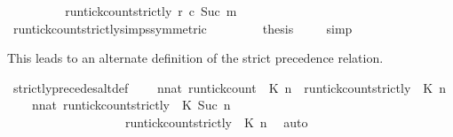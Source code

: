 \begin{isabellebody}
\isanewline
\ \ \ \ \isamarkupfalse%
\ \isamarkupfalse%
\ {\isacartoucheopen}{\isachardot}{\isachardot}{\isachardot}\ {\isacharequal}\ run{\isacharunderscore}tick{\isacharunderscore}count{\isacharunderscore}strictly\ r\ c\ {\isacharparenleft}Suc\ m{\isacharparenright}{\isacartoucheclose}\isanewline
\ \ \ \ \ \ \isamarkupfalse%
\ run{\isacharunderscore}tick{\isacharunderscore}count{\isacharunderscore}strictly{\isachardot}simps{\isacharparenleft}{}{\isacharparenright}{\isacharbrackleft}symmetric{\isacharbrackright}\ \isacommand{{\isachardot}}\isamarkupfalse%
\isanewline
\ \ \ \ \isamarkupfalse%
\ \isamarkupfalse%
\ {\isacharquery}thesis\ \isamarkupfalse%
\ {\isacharasterisk}\ \isamarkupfalse%
\ simp\isanewline
{}\isamarkupfalse%
%
\endisatagproof
{\isafoldproof}%
%
\isadelimproof
%
\endisadelimproof
%
\begin{isamarkuptext}%
This leads to an alternate definition of the strict precedence relation.%
\end{isamarkuptext}\isamarkuptrue%
\isamarkupfalse%
\ strictly{\isacharunderscore}precedes{\isacharunderscore}alt{\isacharunderscore}def{}{\isacharcolon}\isanewline
\ \ {\isacartoucheopen}{\isacharbraceleft}\ {\isasymrho}{\isachardot}\ {\isasymforall}n{\isacharcolon}{\isacharcolon}nat{\isachardot}\ {\isacharparenleft}run{\isacharunderscore}tick{\isacharunderscore}count\ {\isasymrho}\ K\ n{\isacharparenright}\ {\isasymle}\ {\isacharparenleft}run{\isacharunderscore}tick{\isacharunderscore}count{\isacharunderscore}strictly\ {\isasymrho}\ K\ n{\isacharparenright}\ {\isacharbraceright}\isanewline
\ {\isacharequal}\ {\isacharbraceleft}\ {\isasymrho}{\isachardot}\ {\isasymforall}n{\isacharcolon}{\isacharcolon}nat{\isachardot}\ {\isacharparenleft}run{\isacharunderscore}tick{\isacharunderscore}count{\isacharunderscore}strictly\ {\isasymrho}\ K\ {\isacharparenleft}Suc\ n{\isacharparenright}{\isacharparenright}\isanewline
\ \ \ \ \ \ \ \ \ \ \ \ \ \ \ \ \ \ {\isasymle}\ {\isacharparenleft}run{\isacharunderscore}tick{\isacharunderscore}count{\isacharunderscore}strictly\ {\isasymrho}\ K\ n{\isacharparenright}\ {\isacharbraceright}{\isacartoucheclose}\isanewline
%
\isadelimproof
%
\endisadelimproof
%
\isatagproof
{}\isamarkupfalse%
\ auto%
\endisatagproof
{\isafoldproof}%
%
\isadelimproof
%
\endisadelimproof
%

\end{isabellebody}
